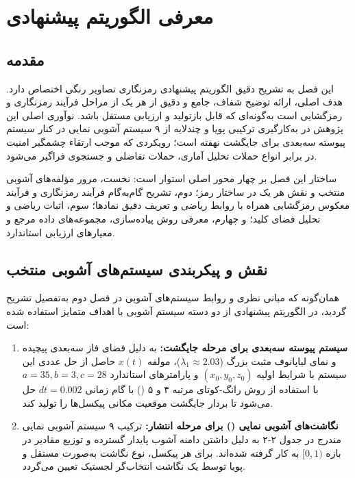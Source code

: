 
\chapter{معرفی الگوریتم پیشنهادی}
\section{مقدمه}

این فصل به تشریح دقیق الگوریتم پیشنهادی رمزنگاری تصاویر رنگی اختصاص دارد. هدف اصلی، ارائه توضیح شفاف، جامع و دقیق از هر یک از مراحل فرآیند رمزنگاری و رمزگشایی است به‌گونه‌ای که قابل بازتولید و ارزیابی مستقل باشد. نوآوری اصلی این پژوهش در به‌کارگیری ترکیبی پویا و چندلایه از ۹ سیستم آشوبی نمایی در کنار سیستم پیوسته سه‌بعدی  برای جایگشت نهفته است؛ رویکردی که موجب ارتقاء چشمگیر امنیت در برابر انواع حملات تحلیل آماری، حملات تفاضلی و جستجوی فراگیر می‌شود.

ساختار این فصل بر چهار محور اصلی استوار است: نخست، مرور مؤلفه‌های آشوبی منتخب و نقش هر یک در ساختار رمز؛ دوم، تشریح گام‌به‌گام فرآیند رمزنگاری و فرآیند معکوس رمزگشایی همراه با روابط ریاضی و تعریف دقیق نمادها؛ سوم، اثبات ریاضی و تحلیل فضای کلید؛ و چهارم، معرفی روش پیاده‌سازی، مجموعه‌های داده مرجع و معیارهای ارزیابی استاندارد.

\section{نقش و پیکربندی سیستم‌های آشوبی منتخب}

همان‌گونه که مبانی نظری و روابط سیستم‌های آشوبی در فصل دوم به‌تفصیل تشریح گردید، در الگوریتم پیشنهادی از دو دسته سیستم آشوبی با اهداف متمایز استفاده شده است:

\begin{enumerate}
    \item \textbf{سیستم پیوسته سه‌بعدی  برای مرحله جایگشت:} به دلیل فضای فاز سه‌بعدی پیچیده و نمای لیاپانوف مثبت بزرگ ($\lambda_1 \approx 2.03$)، مولفه $x(t)$ حاصل از حل عددی این سیستم با شرایط اولیه $(x_0, y_0, z_0)$ و پارامترهای استاندارد $a=35, b=3, c=28$ با استفاده از روش رانگ-کوتای مرتبه ۴ و ۵ () با گام زمانی $dt=0.002$ حل می‌شود تا بردار جایگشت موقعیت مکانی پیکسل‌ها را تولید کند\cite{ref6}.
    \item \textbf{نگاشت‌های آشوبی نمایی () برای مرحله انتشار:} ترکیب ۹ سیستم آشوبی نمایی مندرج در جدول ۲-۲ به دلیل داشتن دامنه آشوب پایدار گسترده و توزیع مقادیر در بازه $[0, 1)$ به کار گرفته شده‌اند. برای هر پیکسل، نوع نگاشت به‌صورت مستقل و پویا توسط یک نگاشت انتخاب‌گر لجستیک تعیین می‌گردد\cite{ref4}.
\end{enumerate}

